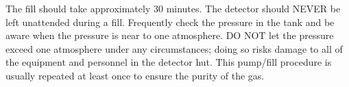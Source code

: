 {The fill should take approximately 30 minutes.  The detector should
NEVER be left unattended during a fill.  Frequently check the pressure
in the tank and be aware when the pressure is near to one atmosphere.
DO NOT let the pressure exceed one atmosphere under any circumstances;
doing so risks damage to all of the equipment and personnel in the
detector hut.  This pump/fill procedure is usually repeated at least
once to ensure the purity of the gas.





}%
